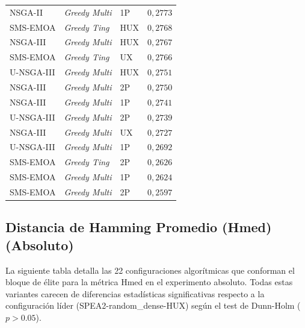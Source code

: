 \begin{longtable}{lllc}
NSGA-II & \textit{Greedy Multi} & 1P & $0{,}2773$ \\
SMS-EMOA & \textit{Greedy Ting} & HUX & $0{,}2768$ \\
NSGA-III & \textit{Greedy Multi} & HUX & $0{,}2767$ \\
SMS-EMOA & \textit{Greedy Ting} & UX & $0{,}2766$ \\
U-NSGA-III & \textit{Greedy Multi} & HUX & $0{,}2751$ \\
NSGA-III & \textit{Greedy Multi} & 2P & $0{,}2750$ \\
NSGA-III & \textit{Greedy Multi} & 1P & $0{,}2741$ \\
U-NSGA-III & \textit{Greedy Multi} & 2P & $0{,}2739$ \\
NSGA-III & \textit{Greedy Multi} & UX & $0{,}2727$ \\
U-NSGA-III & \textit{Greedy Multi} & 1P & $0{,}2692$ \\
SMS-EMOA & \textit{Greedy Ting} & 2P & $0{,}2626$ \\
SMS-EMOA & \textit{Greedy Multi} & 1P & $0{,}2624$ \\
SMS-EMOA & \textit{Greedy Multi} & 2P & $0{,}2597$ \\
\end{longtable}

\subsection{Distancia de Hamming Promedio (Hmed) (Absoluto)}\label{anexo:elite_avghd_abs}

La siguiente tabla detalla las 22 configuraciones algorítmicas que conforman el bloque de élite para la métrica Hmed en el experimento absoluto. Todas estas variantes carecen de diferencias estadísticas significativas respecto a la configuración líder (SPEA2-random\_dense-HUX) según el test de Dunn-Holm ($p > 0.05$).

